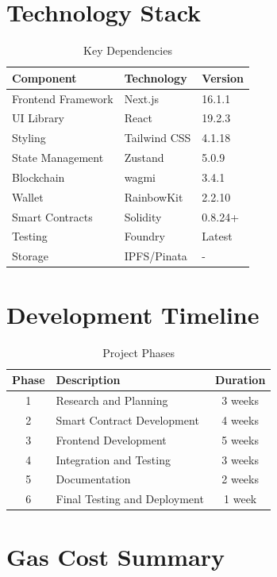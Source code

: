 \section{Technology Stack}

\begin{table}[H]
\centering
\caption{Key Dependencies}
\begin{tabular}{|l|l|l|}
\hline
\textbf{Component} & \textbf{Technology} & \textbf{Version} \\
\hline
Frontend Framework & Next.js & 16.1.1 \\
\hline
UI Library & React & 19.2.3 \\
\hline
Styling & Tailwind CSS & 4.1.18 \\
\hline
State Management & Zustand & 5.0.9 \\
\hline
Blockchain & wagmi & 3.4.1 \\
\hline
Wallet & RainbowKit & 2.2.10 \\
\hline
Smart Contracts & Solidity & 0.8.24+ \\
\hline
Testing & Foundry & Latest \\
\hline
Storage & IPFS/Pinata & - \\
\hline
\end{tabular}
\end{table}

\section{Development Timeline}

\begin{table}[H]
\centering
\caption{Project Phases}
\begin{tabular}{|c|l|c|}
\hline
\textbf{Phase} & \textbf{Description} & \textbf{Duration} \\
\hline
1 & Research and Planning & 3 weeks \\
\hline
2 & Smart Contract Development & 4 weeks \\
\hline
3 & Frontend Development & 5 weeks \\
\hline
4 & Integration and Testing & 3 weeks \\
\hline
5 & Documentation & 2 weeks \\
\hline
6 & Final Testing and Deployment & 1 week \\
\hline
\end{tabular}
\end{table}

\section{Gas Cost Summary}

